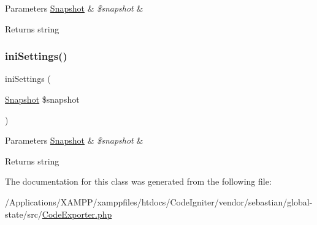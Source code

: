 \begin{DoxyParams}[1]{Parameters}
\mbox{\hyperlink{class_sebastian_bergmann_1_1_global_state_1_1_snapshot}{Snapshot}} & {\em \$snapshot} & \\
\hline
\end{DoxyParams}
\begin{DoxyReturn}{Returns}
string 
\end{DoxyReturn}
\mbox{\label{class_sebastian_bergmann_1_1_global_state_1_1_code_exporter_a42d2489e1d9a4191d9c5ba3d360f4eda}} 
\subsubsection{\texorpdfstring{ini\+Settings()}{iniSettings()}}
{\footnotesize\ttfamily ini\+Settings (\begin{DoxyParamCaption}\item[{\mbox{\hyperlink{class_sebastian_bergmann_1_1_global_state_1_1_snapshot}{Snapshot}}}]{\$snapshot }\end{DoxyParamCaption})}


\begin{DoxyParams}[1]{Parameters}
\mbox{\hyperlink{class_sebastian_bergmann_1_1_global_state_1_1_snapshot}{Snapshot}} & {\em \$snapshot} & \\
\hline
\end{DoxyParams}
\begin{DoxyReturn}{Returns}
string 
\end{DoxyReturn}


The documentation for this class was generated from the following file\+:\begin{DoxyCompactItemize}
\item 
/\+Applications/\+X\+A\+M\+P\+P/xamppfiles/htdocs/\+Code\+Igniter/vendor/sebastian/global-\/state/src/\mbox{\hyperlink{_code_exporter_8php}{Code\+Exporter.\+php}}\end{DoxyCompactItemize}
